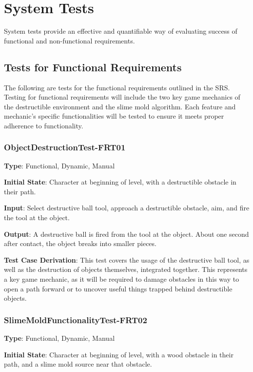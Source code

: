 \documentclass[12pt, titlepage]{article}
\begin{document}
\section{System Tests}\label{systemtests}
System tests provide an effective and quantifiable way of evaluating success of functional
and non-functional requirements.

\subsection{Tests for Functional Requirements}
The following are tests for the functional requirements outlined in the SRS.
Testing for functional requirements will include the two key game mechanics of
the destructible environment and the slime mold algorithm.
Each feature and mechanic's specific functionalities will be tested to ensure
it meets proper adherence to functionality.

\subsubsection{ObjectDestructionTest-FRT01}

\textbf{Type}: Functional, Dynamic, Manual

\textbf{Initial State}: Character at beginning of level, with a destructible
obstacle in their path.

\textbf{Input}: Select destructive ball tool, approach a destructible obstacle, aim,
and fire the tool at the object.

\textbf{Output}: A destructive ball is fired from the tool at the object.
About one second after contact, the object breaks into smaller pieces.

\textbf{Test Case Derivation}: This test covers the usage of the destructive ball
tool, as well as the destruction of objects themselves, integrated together. This
represents a key game mechanic, as it will be required to damage obstacles in this way
to open a path forward or to uncover useful things trapped behind destructible objects.


\subsubsection{SlimeMoldFunctionalityTest-FRT02}

\textbf{Type}: Functional, Dynamic, Manual

\textbf{Initial State}: Character at beginning of level, with a wood obstacle
in their path, and a slime mold source near that obstacle.
\end{document}
